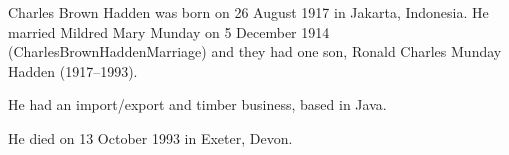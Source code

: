 
Charles Brown Hadden was born on 26 August 1917 in Jakarta, Indonesia.  He married Mildred Mary Munday on 5 December 1914 (CharlesBrownHaddenMarriage) and they had one son, Ronald Charles Munday Hadden (1917--1993).

He had an import/export and timber business, based in Java.

He died on 13 October 1993 in Exeter, Devon.\cite{CharlesBrownHaddenDeath}

